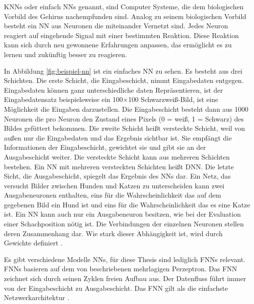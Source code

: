 \Acp{KNN} oder einfach \acp{NN} genannt, sind Computer Systeme, die dem biologischen Vorbild des Gehirns nachempfunden sind. Analog zu seinem biologischen Vorbild besteht ein \ac{NN} aus Neuronen die miteinander Vernetzt sind. Jedes Neuron reagiert auf eingehende Signal mit einer bestimmten Reaktion. Diese Reaktion kann sich durch neu gewonnene Erfahrungen anpassen, das ermöglicht es zu lernen und zukünftig besser zu reagieren.

In Abbildung \autoref{fig:beispiel-nn} ist ein einfaches \acl{NN} zu sehen. Es besteht aus drei Schichten. Die erste Schicht, die Eingabeschicht, nimmt Eingabedaten entgegen. Eingabedaten können ganz unterschiedliche daten Repräsentieren, ist der Eingabedatensatz beispielsweise ein 100×100 Schwarzweiß-Bild, ist eine Möglichkeit die Eingaben darzustellen. Die Eingabeschicht besteht dann aus 1000 Neuronen die pro Neuron den Zustand eines Pixels (0 = weiß, 1 = Schwarz) des Bildes gefüttert bekommen. Die zweite Schicht heißt versteckte Schicht, weil von außen nur die Eingabedaten und das Ergebnis sichtbar ist. Sie empfängt die Informationen der Eingabeschicht, gewichtet sie und gibt sie an der Ausgabeschicht weiter. Die versteckte Schicht kann aus mehreren Schichten bestehen. Ein \ac{NN} mit mehreren versteckten Schichten heißt \ac{DNN}. Die letzte Sicht, die Ausgabeschicht, spiegelt das Ergebnis des \acp{NN} dar. Ein Netz, das versucht Bilder zwischen Hunden und Katzen zu unterscheiden kann zwei Ausgabeneuronen enthalten, eins für die Wahrscheinlichkeit das auf dem gegebenen Bild ein Hund ist und eins für die Wahrscheinlichkeit das es eine Katze ist. Ein \ac{NN} kann auch nur ein Ausgabeneuron besitzen, wie \zb{} bei der Evaluation einer Schachposition nötig ist. Die Verbindungen der einzelnen Neuronen stellen deren Zusammenhang dar. Wie stark dieser Abhängigkeit ist, wird durch Gewichte definiert \cite[S. 2--7]{krawczak2013multilayer}.

Es gibt verschiedene Modelle \aclp{NN}, für diese Thesis sind lediglich \acp{FNN} relevant. \acp{FNN} basieren auf dem von \citeauthor{rosenblatt1958perceptron} \cite{rosenblatt1958perceptron} beschriebenen mehrlagigen Perzeptron. Das \ac{FNN} zeichnet sich durch seinen Zyklen freien Aufbau aus. Der Datenfluss führt immer von der Eingabeschicht zu Ausgabeschicht. Das \ac{FNN} gilt als die einfachste Netzwerkarchitektur \cite{Schmidhuber2015}.

